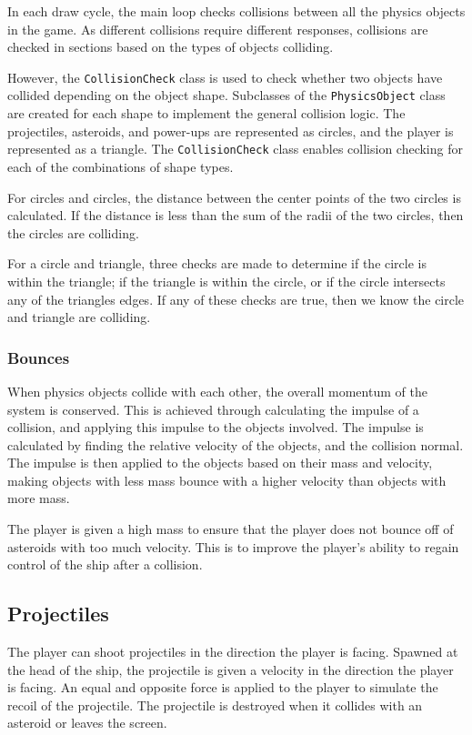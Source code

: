 \documentclass[12pt, a4paper]{article}
\begin{document}
In each draw cycle, the main loop checks collisions between all the physics objects in the game. As different collisions require different responses, collisions are checked in sections based on the types of objects colliding.

However, the \texttt{CollisionCheck} class is used to check whether two objects have collided depending on the object shape. Subclasses of the \texttt{PhysicsObject} class are created for each shape to implement the general collision logic. The projectiles, asteroids, and power-ups are represented as circles, and the player is represented as a triangle. The \texttt{CollisionCheck} class enables collision checking for each of the combinations of shape types.

For circles and circles, the distance between the center points of the two circles is calculated. If the distance is less than the sum of the radii of the two circles, then the circles are colliding.

For a circle and triangle, three checks are made to determine if the circle is within the triangle; if the triangle is within the circle, or if the circle intersects any of the triangles edges. If any of these checks are true, then we know the circle and triangle are colliding.

\subsubsection{Bounces}

When physics objects collide with each other, the overall momentum of the system is conserved. This is achieved through calculating the impulse of a collision, and applying this impulse to the objects involved. The impulse is calculated by finding the relative velocity of the objects, and the collision normal. The impulse is then applied to the objects based on their mass and velocity, making objects with less mass bounce with a higher velocity than objects with more mass.

The player is given a high mass to ensure that the player does not bounce off of asteroids with too much velocity. This is to improve the player's ability to regain control of the ship after a collision.

\subsection{Projectiles}

The player can shoot projectiles in the direction the player is facing. Spawned at the head of the ship, the projectile is given a velocity in the direction the player is facing. An equal and opposite force is applied to the player to simulate the recoil of the projectile. The projectile is destroyed when it collides with an asteroid or leaves the screen.
\end{document}
